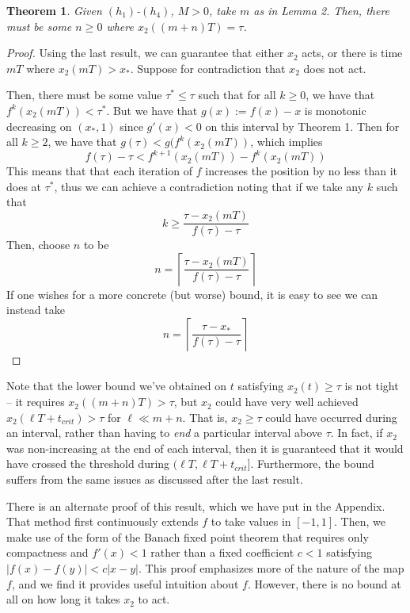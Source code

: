 \documentclass[preprint,12pt]{elsarticle}
\newcommand{\lt}{\left}
\newcommand{\rt}{\right}
\newtheorem{theorem}{Theorem}
\begin{document}
\begin{theorem}\label{thm:actsAgain}
    Given $(h_1)$-$(h_4)$, $M > 0$, take $m$ as in Lemma 2. Then, there must be some $n \geq 0$ where $x_2((m+n)T) = \tau$. 
\end{theorem}
\begin{proof}
   Using the last result, we can guarantee that either $x_2$ acts, or there is time $mT$ where $x_2(mT) > x_*$. Suppose for contradiction that $x_2$ does not act. 
   
   Then, there must be some value $\tau^* \leq \tau$ such that for all $k \geq 0$, we have that $f^k(x_2(mT)) < \tau^*$. But we have that $g(x):= f(x) - x$ is monotonic decreasing on $(x_*,1)$ since $g'(x) < 0$ on this interval by Theorem 1. Then for all $k \geq 2$, we have that $g(\tau) < g(f^k(x_2(mT))$, which implies \[
   f(\tau) - \tau  < f^{k+1}(x_2(mT)) - f^k(x_2(mT))
   \]
   This means that that each iteration of $f$ increases the position by no less than it does at $\tau^*$, thus we can achieve a contradiction noting that if we take any $k$ such that \[
   k \geq \frac{\tau - x_2(mT)}{f(\tau) - \tau}
   \]
   Then, choose $n$ to be \[
   n = \lt \lceil \frac{\tau - x_2(mT)}{f(\tau) - \tau} \rt \rceil
   \]
   If one wishes for a more concrete (but worse) bound, it is easy to see we can instead take \[
   n = \lt \lceil \frac{\tau - x_*}{f(\tau) - \tau} \rt \rceil
   \] 
\end{proof}
Note that the lower bound we've obtained on $t$ satisfying $x_2(t) \geq \tau$ is not tight -- it requires $x_2((m+n)T) > \tau$, but $x_2$ could have very well achieved $x_2(\ell T + t_{crit}) > \tau$ for $\ell \ll m+n$. That is, $x_2 \geq \tau$ could have occurred during an interval, rather than having to \textit{end} a particular interval above $\tau$. In fact, if $x_2$ was non-increasing at the end of each interval, then it is guaranteed that it would have crossed the threshold during $(\ell T, \ell T + t_{crit}]$. Furthermore, the bound suffers from the same issues as discussed after the last result. 

There is an alternate proof of this result, which we have put in the Appendix. That method first continuously extends $f$ to take values in $[-1,1]$. Then, we make use of the form of the Banach fixed point theorem that requires only compactness and $f'(x) < 1$ rather than a fixed coefficient $c <1$ satisfying $|f(x) - f(y)| < c|x-y|$. This proof emphasizes more of the nature of the map $f$, and we find it provides useful intuition about $f$. However, there is no bound at all on how long it takes $x_2$ to act. 
\end{document}

